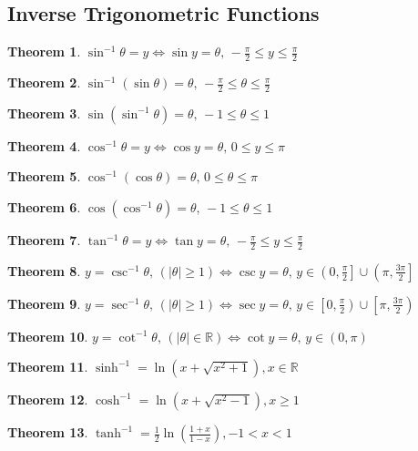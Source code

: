 \documentclass[10pt]{report}
\newtheorem{thm3}{Theorem}[subsection]
\begin{document}
\subsection{Inverse Trigonometric Functions}
\begin{thm3}$\sin^{-1} \theta = y \iff \sin y = \theta\text{, }-\frac{\pi}{2} \leq y \leq \frac{\pi}{2}$\end{thm3}
\begin{thm3}$\sin^{-1}(\sin\theta) = \theta \text{,  }- \frac{\pi}{2} \leq \theta \leq \frac{\pi}{2}$\end{thm3}
\begin{thm3}$\sin(\sin^{-1} \theta) = \theta\text{, }-1 \leq \theta \leq 1$\end{thm3}
\begin{thm3}$\cos^{-1} \theta = y \iff \cos y = \theta\text{, }0 \leq y \leq \pi$\end{thm3}
\begin{thm3}$\cos^{-1}(\cos \theta) = \theta\text{, }0 \leq \theta \leq \pi$\end{thm3}
\begin{thm3}$\cos(\cos^{-1} \theta) = \theta\text{, }-1 \leq \theta \leq 1$\end{thm3}
\begin{thm3}$\tan^{-1} \theta = y \iff \tan y = \theta\text{, }-\frac{\pi}{2} \leq y \leq \frac{\pi}{2}$\end{thm3}
\begin{thm3}$y = \csc^{-1} \theta\text{, }(| \theta | \geq 1) \iff \csc y = \theta\text{, }y \in \left(0, \frac{\pi}{2}\right] \cup \left(\pi, \frac{3 \pi}{2}\right]$\end{thm3}
\begin{thm3}$y = \sec^{-1} \theta\text{, }(| \theta | \geq 1) \iff \sec y = \theta\text{, }y \in \left[0, \frac{\pi}{2}\right) \cup \left[\pi, \frac{3 \pi}{2}\right)$\end{thm3}
\begin{thm3}$y = \cot^{-1} \theta\text{, }(| \theta | \in \mathbb{R}) \iff \cot y = \theta\text{, }y \in (0,\pi)$\end{thm3}
\begin{thm3}$\sinh^{-1}=\ln (x+\sqrt{x^2+1}), x\in\mathbb{R}$\end{thm3}
\begin{thm3}$\cosh^{-1}=\ln (x+\sqrt{x^2-1}), x\geq 1$\end{thm3}
\begin{thm3}$\tanh^{-1}=\frac{1}{2}\ln \left(\frac{1+x}{1-x}\right), -1<x<1$\end{thm3}
\end{document}
